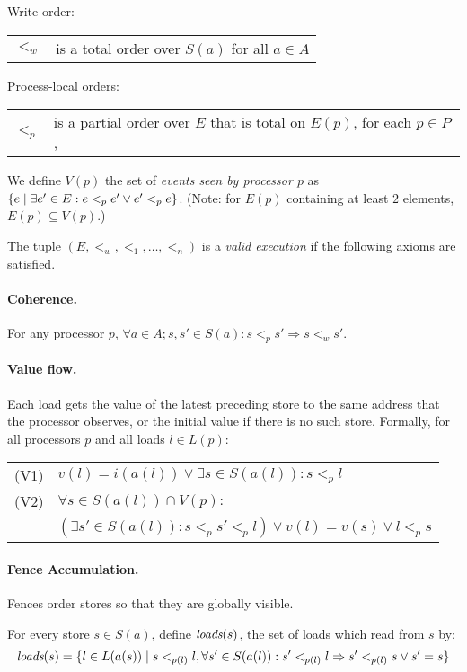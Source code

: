 \documentclass[10pt]{article}
\def\withmmode#1{\relax\ifmmode#1\else{$#1$}\fi}
\def\alt{\withmmode{\;{\tt\char`\|}\;}}
\def\loads{\mbox{\em loads}}
\begin{document}
\noindent Write order:

\begin{tabular}[t]{ll}
  $<_w$ & is a total order over $S(a)$ for all $a\in A$
\end{tabular}

\noindent Process-local orders:

\begin{tabular}[t]{ll}
$<_p$ & is a partial order over $E$ that is total on $E(p)$, for each
$p\in P$,
\end{tabular}

\noindent We define $V(p)$ the set of {\em events seen by processor
$p$} as $\{e\alt \exists e' \in E: e <_p e' \vee e' <_p e\}$. (Note:
for $E(p)$ containing at least $2$ elements, $E(p) \subseteq V(p)$.)

The tuple $(E,<_w,<_1, \ldots, <_n)$ is a {\em valid execution} if the
following axioms are satisfied.

\paragraph{Coherence.}
For any processor $p$,  
$\forall a\in A;s,s'\in S(a): s <_p s' \Rightarrow s <_w s'$.

\paragraph{Value flow.} Each load gets the value of the latest preceding store 
to the same address that the processor observes, or the initial value
if there is no such store. 
Formally, for all processors $p$ and all loads $l \in L(p)$:

\begin{tabular}[t]{ll}
(V1) & $v(l)=i(a(l))   \vee \exists s\in S(a(l)): s <_p l$ \\
(V2) & $\forall s \in S(a(l))\cap V(p):$\\
& $(\exists s'\in S(a(l)): s <_p s' <_p l) \vee v(l)=v(s)\vee l <_{p} s$
\end{tabular}

{}\paragraph{Fence Accumulation.} 
Fences order stores so that they are globally visible.

For every store $s\in S(a)$, define $\loads(s)$, the set of loads
which read from $s$ by:
$$\loads(s) = \{ l \in L(a(s))\alt s <_{p(l)} l, 
\forall s'\in S(a(l)): s' <_{p(l)} l \Rightarrow s' <_{p(l)} s \vee s'=s\}$$
\end{document}
